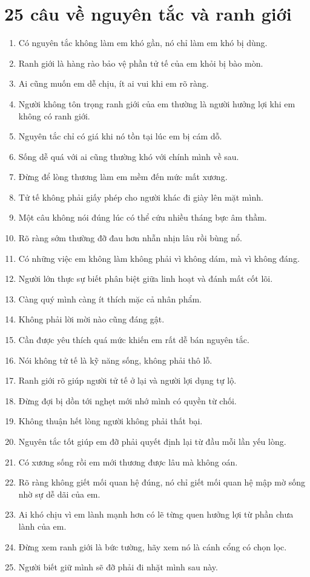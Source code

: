 \section{25 câu về nguyên tắc và ranh giới}
\begin{enumerate}[leftmargin=*,resume]
\item Có nguyên tắc không làm em khó gần, nó chỉ làm em khó bị dùng.
\item Ranh giới là hàng rào bảo vệ phần tử tế của em khỏi bị bào mòn.
\item Ai cũng muốn em dễ chịu, ít ai vui khi em rõ ràng.
\item Người không tôn trọng ranh giới của em thường là người hưởng lợi khi em không có ranh giới.
\item Nguyên tắc chỉ có giá khi nó tồn tại lúc em bị cám dỗ.
\item Sống dễ quá với ai cũng thường khó với chính mình về sau.
\item Đừng để lòng thương làm em mềm đến mức mất xương.
\item Tử tế không phải giấy phép cho người khác đi giày lên mặt mình.
\item Một câu không nói đúng lúc có thể cứu nhiều tháng bực âm thầm.
\item Rõ ràng sớm thường đỡ đau hơn nhẫn nhịn lâu rồi bùng nổ.
\item Có những việc em không làm không phải vì không dám, mà vì không đáng.
\item Người lớn thực sự biết phân biệt giữa linh hoạt và đánh mất cốt lõi.
\item Càng quý mình càng ít thích mặc cả nhân phẩm.
\item Không phải lời mời nào cũng đáng gật.
\item Cần được yêu thích quá mức khiến em rất dễ bán nguyên tắc.
\item Nói không tử tế là kỹ năng sống, không phải thô lỗ.
\item Ranh giới rõ giúp người tử tế ở lại và người lợi dụng tự lộ.
\item Đừng đợi bị dồn tới nghẹt mới nhớ mình có quyền từ chối.
\item Không thuận hết lòng người không phải thất bại.
\item Nguyên tắc tốt giúp em đỡ phải quyết định lại từ đầu mỗi lần yếu lòng.
\item Có xương sống rồi em mới thương được lâu mà không oán.
\item Rõ ràng không giết mối quan hệ đúng, nó chỉ giết mối quan hệ mập mờ sống nhờ sự dễ dãi của em.
\item Ai khó chịu vì em lành mạnh hơn có lẽ từng quen hưởng lợi từ phần chưa lành của em.
\item Đừng xem ranh giới là bức tường, hãy xem nó là cánh cổng có chọn lọc.
\item Người biết giữ mình sẽ đỡ phải đi nhặt mình sau này.
\end{enumerate}

